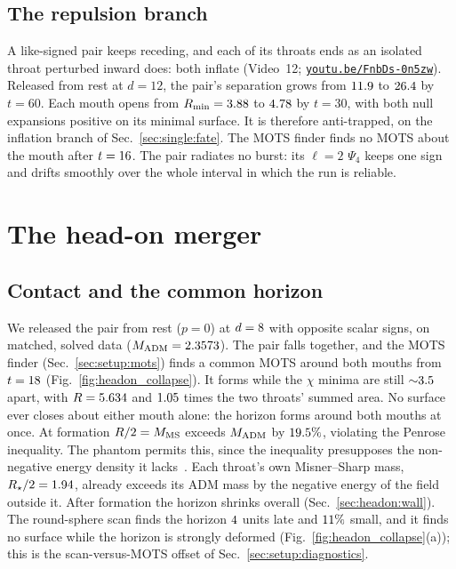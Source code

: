 \documentclass[twocolumn,floatfix,aps,prd,superscriptaddress,nofootinbib]{revtex4-2}
\begin{document}
\subsection{The repulsion branch}
\label{sec:pair:recede}

A like-signed pair keeps receding, and each of its throats ends as an isolated throat perturbed inward does: both inflate (Video~12; \href{https://youtu.be/FnbDs-0n5zw}{\nolinkurl{youtu.be/FnbDs-0n5zw}}). Released from rest at $d=12$, the pair's separation grows from $11.9$ to $26.4$ by $t=60$. Each mouth opens from $R_{\min}=3.88$ to $4.78$ by $t=30$, with both null expansions positive on its minimal surface. It is therefore anti-trapped, on the inflation branch of Sec.~\ref{sec:single:fate}. The MOTS finder finds no MOTS about the mouth after $t=16$. The pair radiates no burst: its $\ell=2$ $\Psi_4$ keeps one sign and drifts smoothly over the whole interval in which the run is reliable.

\section{The head-on merger}
\label{sec:headon}

\subsection{Contact and the common horizon}
\label{sec:headon:contact}

We released the pair from rest ($p=0$) at $d=8$ with opposite scalar signs, on matched, solved data ($M_{\rm ADM}=2.3573$). The pair falls together, and the MOTS finder (Sec.~\ref{sec:setup:mots}) finds a common MOTS around both mouths from $t=18$ (Fig.~\ref{fig:headon_collapse}). It forms while the $\chi$ minima are still ${\sim}3.5$ apart, with $R=5.634$ and $1.05$ times the two throats' summed area. No surface ever closes about either mouth alone: the horizon forms around both mouths at once. At formation $R/2=M_{\rm MS}$ exceeds $M_{\rm ADM}$ by $19.5\%$, violating the Penrose inequality. The phantom permits this, since the inequality presupposes the non-negative energy density it lacks~\cite{huisken2001,mars2009}. Each throat's own Misner--Sharp mass, $R_\star/2=1.94$, already exceeds its ADM mass by the negative energy of the field outside it. After formation the horizon shrinks overall (Sec.~\ref{sec:headon:wall}). The round-sphere scan finds the horizon $4$ units late and $11\%$ small, and it finds no surface while the horizon is strongly deformed (Fig.~\ref{fig:headon_collapse}(a)); this is the scan-versus-MOTS offset of Sec.~\ref{sec:setup:diagnostics}.
\end{document}
